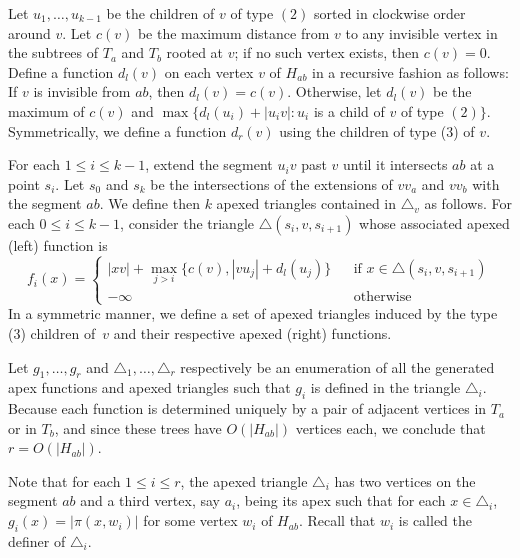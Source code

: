 \documentclass[a4paper]{article}
\newcommand{\g}[2]{\ensuremath{|\pi(#1, #2)|}}
\begin{document}
Let $u_1, \ldots, u_{k-1}$ be the children of $v$ of type $(2)$ sorted in clockwise order around $v$.
Let $c(v)$ be the maximum distance from $v$ to any invisible vertex in the subtrees of $T_a$ and $T_b$ rooted at $v$; if no such vertex exists, then $c(v) = 0$. 
Define a function $d_l(v)$ on each vertex $v$ of $H_{ab}$ in a recursive fashion as follows:
If $v$ is invisible from $ab$, then $d_l(v) = c(v)$. 
Otherwise, let $d_l(v)$ be the maximum of $c(v)$ and $\max\{d_l(u_i) + |u_iv| : u_i$ is a child of $v$ of type $(2)\}$.
Symmetrically, we define a function $d_r(v)$ using the children of type (3) of $v$.

For each $1\leq i\leq k-1$, extend the segment $u_iv$ past $v$ until it intersects $ab$ at a point $s_i$. Let $s_0$ and $s_k$ be the intersections of the extensions of $vv_a$ and $vv_b$ with the segment $ab$.
We define then $k$ apexed triangles contained in $\triangle_v$ as follows. 
For each $0\leq i\leq k-1$, consider the triangle $\triangle(s_i, v, s_{i+1})$ whose associated apexed (left) function is 
$$f_i(x) = \left\{ \begin{array}{lll}
|xv| + \max_{j>i}\{c(v), |vu_j| + d_l(u_j)\} && \text{if $x\in \triangle(s_i, v, s_{i+1})$}\\
-\infty&&\text{otherwise}
\end{array}\right.$$
In a symmetric manner, we define a set of apexed triangles induced by the type (3) children of~$v$ and their respective apexed (right) functions.

Let $g_1, \ldots, g_r$ and $\triangle_1, \ldots, \triangle_r$ respectively be an enumeration of all the generated apex functions and apexed triangles such that $g_i$ is defined in the triangle $\triangle_i$. Because each function is determined uniquely by a pair of adjacent vertices in $T_a$ or in $T_b$, and since these trees have $O(|H_{ab}|)$ vertices each, we conclude that $r = O(|H_{ab}|)$. 

Note that for each $1\leq i\leq r$, the apexed triangle $\triangle_i$ has two vertices on the segment $ab$ and a third vertex, say $a_i$, being its apex such that for each $x\in \triangle_i$, $g_i(x) = \g{x}{w_i}$ for some vertex $w_i$ of $H_{ab}$. Recall that $w_i$ is called the definer of $\triangle_i$.
\end{document}
